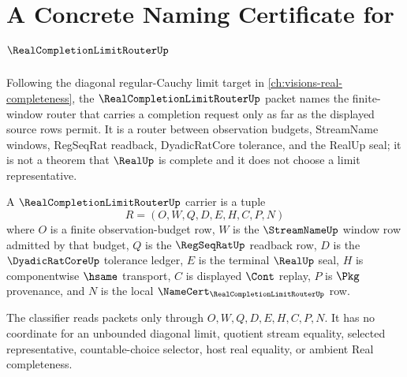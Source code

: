 \chapter{A Concrete Naming Certificate for $\RealCompletionLimitRouterUp$}
\label{ch:concrete-instances-real-completion-limit-router-namecert}

Following the diagonal regular-Cauchy limit target in \autoref{ch:visions-real-completeness}, the $\RealCompletionLimitRouterUp$ packet names the finite-window router that carries a completion request only as far as the displayed source rows permit. It is a router between observation budgets, StreamName windows, RegSeqRat readback, DyadicRatCore tolerance, and the RealUp seal; it is not a theorem that $\RealUp$ is complete and it does not choose a limit representative.

\begin{definition}
\label{def:real-completion-limit-router-carrier}
A $\RealCompletionLimitRouterUp$ carrier is a tuple
$$
R=(O,W,Q,D,E,H,C,P,N)
$$
where $O$ is a finite observation-budget row, $W$ is the $\StreamNameUp$ window row admitted by that budget, $Q$ is the $\RegSeqRatUp$ readback row, $D$ is the $\DyadicRatCoreUp$ tolerance ledger, $E$ is the terminal $\RealUp$ seal, $H$ is componentwise $\hsame$ transport, $C$ is displayed $\Cont$ replay, $P$ is $\Pkg$ provenance, and $N$ is the local $\NameCert_{\RealCompletionLimitRouterUp}$ row.

The classifier reads packets only through $O,W,Q,D,E,H,C,P,N$. It has no coordinate for an unbounded diagonal limit, quotient stream equality, selected representative, countable-choice selector, host real equality, or ambient Real completeness.
\end{definition}

